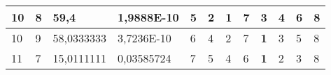 \documentclass[conference]{IEEEtran}
\begin{document}
\begin{table*}[]
\begin{tabular}{|llll|llllllll|}
\multicolumn{1}{|l|}{10}                                                    & \multicolumn{1}{l|}{8}                                                        & \multicolumn{1}{l|}{59,4}                                                         & 1,9888E-10                     & \multicolumn{1}{l|}{5}                                                  & \multicolumn{1}{l|}{2}                                                  & \multicolumn{1}{l|}{\textbf{1}}                                         & \multicolumn{1}{l|}{7}                                                  & \multicolumn{1}{l|}{3}                                                  & \multicolumn{1}{l|}{4}                                                  & \multicolumn{1}{l|}{6}                                                  & 8                          \\ \hline
\multicolumn{1}{|l|}{10}                                                    & \multicolumn{1}{l|}{9}                                                        & \multicolumn{1}{l|}{58,0333333}                                                   & 3,7236E-10                     & \multicolumn{1}{l|}{6}                                                  & \multicolumn{1}{l|}{4}                                                  & \multicolumn{1}{l|}{2}                                                  & \multicolumn{1}{l|}{7}                                                  & \multicolumn{1}{l|}{\textbf{1}}                                         & \multicolumn{1}{l|}{3}                                                  & \multicolumn{1}{l|}{5}                                                  & 8                          \\ \hline
\multicolumn{1}{|l|}{11}                                                    & \multicolumn{1}{l|}{7}                                                        & \multicolumn{1}{l|}{15,0111111}                                                   & 0,03585724                     & \multicolumn{1}{l|}{7}                                                  & \multicolumn{1}{l|}{5}                                                  & \multicolumn{1}{l|}{4}                                                  & \multicolumn{1}{l|}{6}                                                  & \multicolumn{1}{l|}{\textbf{1}}                                         & \multicolumn{1}{l|}{2}                                                  & \multicolumn{1}{l|}{3}                                                  & 8                          \\ \hline

\end{tabular}
\end{table*}
\end{document}
